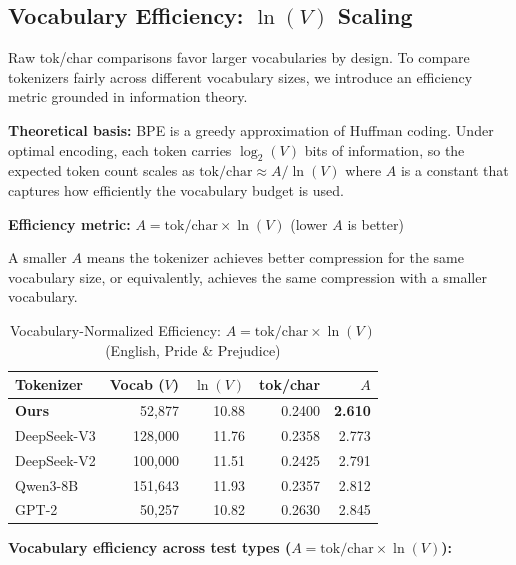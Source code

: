 \subsection{Vocabulary Efficiency: $\ln(V)$ Scaling}

Raw tok/char comparisons favor larger vocabularies by design. To compare tokenizers fairly across different vocabulary sizes, we introduce an efficiency metric grounded in information theory.

\textbf{Theoretical basis:} BPE is a greedy approximation of Huffman coding. Under optimal encoding, each token carries $\log_2(V)$ bits of information, so the expected token count scales as $\text{tok/char} \approx A / \ln(V)$ where $A$ is a constant that captures how efficiently the vocabulary budget is used.

\textbf{Efficiency metric:} $A = \text{tok/char} \times \ln(V)$ \quad (lower $A$ is better)

A smaller $A$ means the tokenizer achieves better compression for the same vocabulary size, or equivalently, achieves the same compression with a smaller vocabulary.

\begin{table}[h]
    \centering
    \caption{Vocabulary-Normalized Efficiency: $A = \text{tok/char} \times \ln(V)$ (English, Pride \& Prejudice)}
    \begin{tabular}{lrrrr}
        \toprule
        \textbf{Tokenizer} & \textbf{Vocab ($V$)} & \textbf{$\ln(V)$} & \textbf{tok/char} & \textbf{$A$} \\
        \midrule
        \textbf{Ours} & 52,877 & 10.88 & 0.2400 & \textbf{2.610} \\
        DeepSeek-V3 & 128,000 & 11.76 & 0.2358 & 2.773 \\
        DeepSeek-V2 & 100,000 & 11.51 & 0.2425 & 2.791 \\
        Qwen3-8B & 151,643 & 11.93 & 0.2357 & 2.812 \\
        GPT-2 & 50,257 & 10.82 & 0.2630 & 2.845 \\
        \bottomrule
    \end{tabular}
\end{table}

\textbf{Vocabulary efficiency across test types ($A = \text{tok/char} \times \ln(V)$):}

\begin{table}[h]
    \centering
\end{table}

